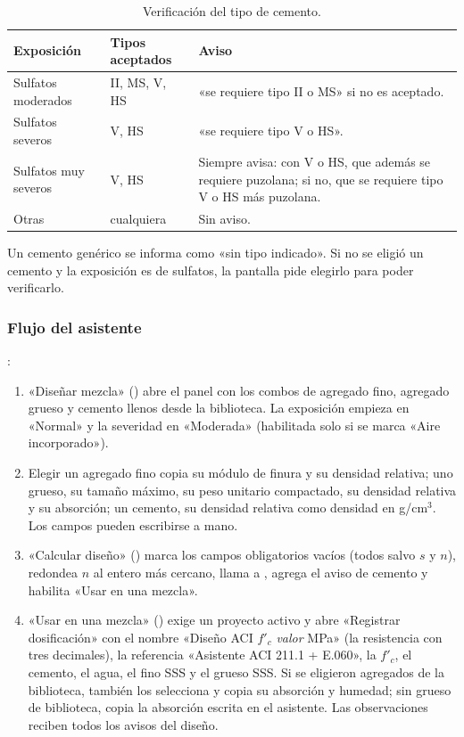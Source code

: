 \begin{table}[H]
	\centering
	\caption{Verificación del tipo de cemento.}
	\label{tab:con-sulfatos}
	\begin{tabular}{L{3.4cm}L{3.8cm}L{6.4cm}}
		\hline
		\textbf{Exposición} & \textbf{Tipos aceptados} & \textbf{Aviso} \\ \hline
		Sulfatos moderados & II, MS, V, HS & «se requiere tipo II o MS» si no es aceptado. \\
		Sulfatos severos & V, HS & «se requiere tipo V o HS». \\
		Sulfatos muy severos & V, HS & Siempre avisa: con V o HS, que además se requiere puzolana; si no, que se requiere
		tipo V o HS más puzolana. \\
		Otras & cualquiera & Sin aviso. \\
		\hline
	\end{tabular}
\end{table}

Un cemento genérico se informa como «sin tipo indicado». Si no se eligió un cemento y la exposición es de sulfatos, la
pantalla pide elegirlo para poder verificarlo.

\subsubsection{Flujo del asistente}

:

\begin{enumerate}
	\item «Diseñar mezcla» () abre el panel con los combos de agregado fino, agregado grueso y cemento
	      llenos desde la biblioteca. La exposición empieza en «Normal» y la severidad en «Moderada» (habilitada solo
	      si se marca «Aire incorporado»).
	\item Elegir un agregado fino copia su módulo de finura y su densidad relativa; uno grueso, su tamaño máximo, su
	      peso unitario compactado, su densidad relativa y su absorción; un cemento, su densidad relativa como densidad
	      en g/cm$^3$. Los campos pueden escribirse a mano.
	\item «Calcular diseño» () marca los campos obligatorios vacíos (todos salvo $s$ y $n$),
	      redondea $n$ al entero más cercano, llama a , agrega el aviso de cemento y habilita
	      «Usar en una mezcla».
	\item «Usar en una mezcla» () exige un proyecto activo y abre «Registrar dosificación» con el
	      nombre «Diseño ACI $f'_c$ \textit{valor} MPa» (la resistencia con tres decimales), la referencia «Asistente
	      ACI 211.1 + E.060», la $f'_c$, el cemento, el agua, el fino SSS y el grueso SSS. Si se eligieron agregados de la biblioteca, también los selecciona y copia
	      su absorción y humedad; sin grueso de biblioteca, copia la absorción escrita en el asistente. Las observaciones
	      reciben todos los avisos del diseño.
\end{enumerate}


